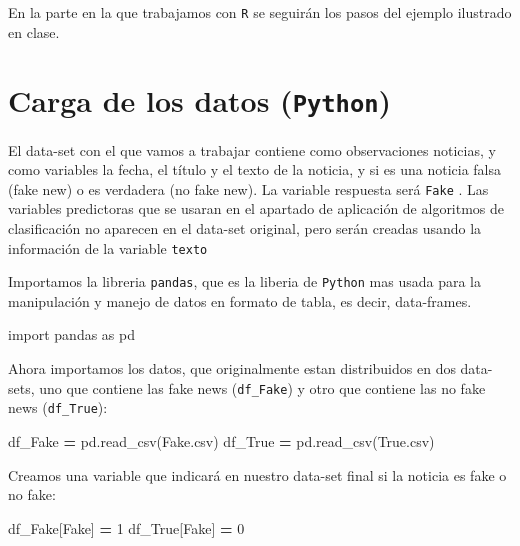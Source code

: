 \documentclass[
  11pt,
  a4paper,
]{article}
\newenvironment{Shaded}{\begin{snugshade}}{\end{snugshade}}
\newcommand{\DecValTok}[1]{\textcolor[rgb]{0.00,0.00,0.81}{#1}}
\newcommand{\ImportTok}[1]{#1}
\newcommand{\NormalTok}[1]{#1}
\newcommand{\OperatorTok}[1]{\textcolor[rgb]{0.81,0.36,0.00}{\textbf{#1}}}
\newcommand{\StringTok}[1]{\textcolor[rgb]{0.31,0.60,0.02}{#1}}
\begin{document}
En la parte en la que trabajamos con \texttt{R} se seguirán los pasos
del ejemplo ilustrado en clase.

\hypertarget{carga-de-los-datos-python}{%
\section{\texorpdfstring{Carga de los datos
(\texttt{Python})}{Carga de los datos (Python)}}\label{carga-de-los-datos-python}}

El data-set con el que vamos a trabajar contiene como observaciones
noticias, y como variables la fecha, el título y el texto de la noticia,
y si es una noticia falsa (fake new) o es verdadera (no fake new). La
variable respuesta será \texttt{Fake} . Las variables predictoras que se
usaran en el apartado de aplicación de algoritmos de clasificación no
aparecen en el data-set original, pero serán creadas usando la
información de la variable \texttt{texto}

Importamos la libreria \texttt{pandas}, que es la liberia de
\texttt{Python} mas usada para la manipulación y manejo de datos en
formato de tabla, es decir, data-frames.

\begin{Shaded}
\begin{Highlighting}[]
\ImportTok{import}\NormalTok{ pandas }\ImportTok{as}\NormalTok{ pd}
\end{Highlighting}
\end{Shaded}

Ahora importamos los datos, que originalmente estan distribuidos en dos
data-sets, uno que contiene las fake news (\texttt{df\_Fake}) y otro que
contiene las no fake news (\texttt{df\_True}):

\begin{Shaded}
\begin{Highlighting}[]
\NormalTok{df\_Fake }\OperatorTok{=}\NormalTok{ pd.read\_csv(}\StringTok{\textquotesingle{}Fake.csv\textquotesingle{}}\NormalTok{)}
\NormalTok{df\_True }\OperatorTok{=}\NormalTok{ pd.read\_csv(}\StringTok{\textquotesingle{}True.csv\textquotesingle{}}\NormalTok{)}
\end{Highlighting}
\end{Shaded}

Creamos una variable que indicará en nuestro data-set final si la
noticia es fake o no fake:

\begin{Shaded}
\begin{Highlighting}[]
\NormalTok{df\_Fake[}\StringTok{\textquotesingle{}Fake\textquotesingle{}}\NormalTok{] }\OperatorTok{=} \DecValTok{1}
\NormalTok{df\_True[}\StringTok{\textquotesingle{}Fake\textquotesingle{}}\NormalTok{] }\OperatorTok{=} \DecValTok{0}
\end{Highlighting}
\end{Shaded}
\end{document}
